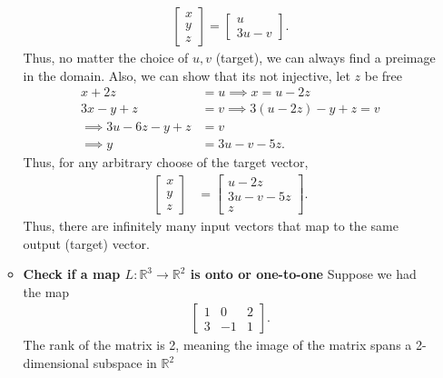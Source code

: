 \documentclass{report}
\begin{document}
\begin{itemize}
\begin{itemize}
\begin{align*}
\begin{bmatrix}
                        x \\ y \\ z 
                    \end{bmatrix}
                    = \begin{bmatrix} u \\ 3u - v\end{bmatrix}
                .\end{align*}
                \bigbreak \noindent 
                Thus, no matter the choice of $u,v$ (target), we can always find a preimage in the domain.
                \bigbreak \noindent 
                Also, we can show that its not injective, let $z$ be free
                \begin{align*}
                    x + 2z &= u \implies x = u-2z \\
                    3x - y + z &= v \implies  3(u-2z) -y  + z =v \\
                    \implies 3u-6z-y+z&=v \\
                    \implies y &= 3u-v-5z
                .\end{align*}
                \bigbreak \noindent 
                Thus, for any arbitrary choose of the target vector, 
                \begin{align*}
                    \begin{bmatrix} x \\ y \\ z\end{bmatrix} &= \begin{bmatrix} u - 2z \\ 3u-v-5z  \\ z\end{bmatrix}
                .\end{align*}
                \bigbreak \noindent 
                Thus, there are infinitely many input vectors that map to the same output (target) vector.
            \item \textbf{Check if a map $L: \mathbb{R}^{3} \to \mathbb{R}^{2} $ is onto or one-to-one}
                Suppose we had the map
                \begin{align*}
                    \begin{bmatrix} 1 & 0 & 2 \\ 3 & -1 & 1 \end{bmatrix}
                .\end{align*}
                \bigbreak \noindent 
                The rank of the matrix is 2, meaning the image of the matrix spans a 2-dimensional subspace in $\mathbb{R}^{2} $

\end{itemize}
\end{itemize}
\end{document}
